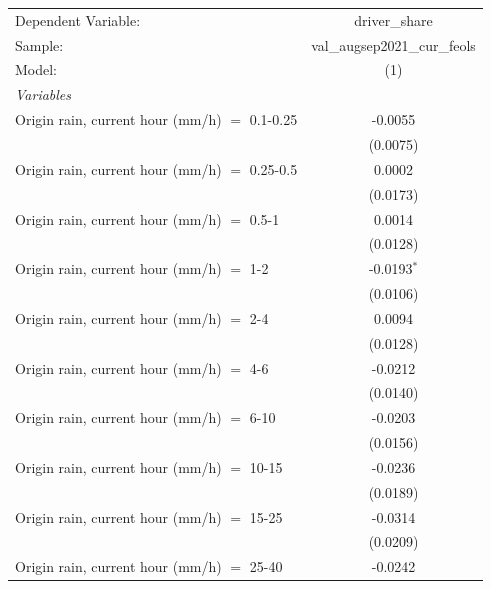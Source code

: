 \ifdefined\ifclassloaded
{}
\fi

\begingroup
\centering
\begin{tabular}{lc}
   \tabularnewline \midrule \midrule
   Dependent Variable:                           & driver\_share\\   
   Sample:                                       & val\_augsep2021\_cur\_feols \\      
   Model:                                        & (1)\\  
   \midrule
   \emph{Variables}\\
   Origin rain, current hour (mm/h) $=$ 0.1-0.25 & -0.0055\\   
                                                 & (0.0075)\\   
   Origin rain, current hour (mm/h) $=$ 0.25-0.5 & 0.0002\\   
                                                 & (0.0173)\\   
   Origin rain, current hour (mm/h) $=$ 0.5-1    & 0.0014\\   
                                                 & (0.0128)\\   
   Origin rain, current hour (mm/h) $=$ 1-2      & -0.0193$^{*}$\\   
                                                 & (0.0106)\\   
   Origin rain, current hour (mm/h) $=$ 2-4      & 0.0094\\   
                                                 & (0.0128)\\   
   Origin rain, current hour (mm/h) $=$ 4-6      & -0.0212\\   
                                                 & (0.0140)\\   
   Origin rain, current hour (mm/h) $=$ 6-10     & -0.0203\\   
                                                 & (0.0156)\\   
   Origin rain, current hour (mm/h) $=$ 10-15    & -0.0236\\   
                                                 & (0.0189)\\   
   Origin rain, current hour (mm/h) $=$ 15-25    & -0.0314\\   
                                                 & (0.0209)\\   
   Origin rain, current hour (mm/h) $=$ 25-40    & -0.0242\\   

\end{tabular}
